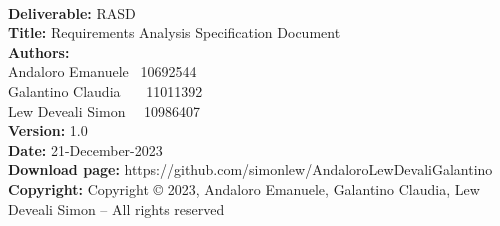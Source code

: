 \documentclass{Configuration_Files/PoliMi3i_project}
\begin{document}
    
    
    
    \pagestyle{empty} %
    \frontmatter %
    
    \newpage
        \textbf{}\\
        \textbf{Deliverable:} RASD\\
        \textbf{Title:} Requirements Analysis Specification Document \\
        \textbf{Authors:} \\ Andaloro Emanuele \ 10692544 \\ 
          Galantino Claudia \ \ \ 11011392 \\
          Lew Deveali Simon \ \ 10986407 \\
        \textbf{Version:} 1.0 \\ 
        \textbf{Date:}  21-December-2023 \\
        \textbf{Download page:} https://github.com/simonlew/AndaloroLewDevaliGalantino \\
        \textbf{Copyright:} Copyright © 2023, Andaloro Emanuele, Galantino Claudia, Lew Deveali Simon – All rights reserved \\
    
    
\end{document}
